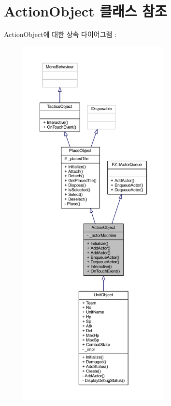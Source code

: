 \hypertarget{class_action_object}{}\section{Action\+Object 클래스 참조}
\label{class_action_object}


Action\+Object에 대한 상속 다이어그램 \+: 
\nopagebreak
\begin{figure}[H]
\begin{center}
\leavevmode
\includegraphics[height=550pt]{class_action_object__inherit__graph}
\end{center}
\end{figure}



